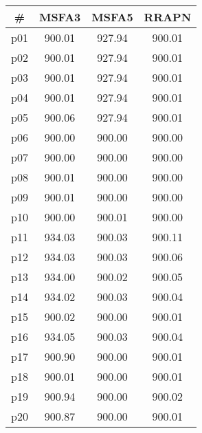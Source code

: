 \begin{tabular}{c||c|c|c}
\textbf{\#} & \textbf{MSFA3} & \textbf{MSFA5} & \textbf{RRAPN}\\
\hline
\hline
p01 & 900.01 & 927.94 & 900.01\\
p02 & 900.01 & 927.94 & 900.01\\
p03 & 900.01 & 927.94 & 900.01\\
p04 & 900.01 & 927.94 & 900.01\\
p05 & 900.06 & 927.94 & 900.01\\
p06 & 900.00 & 900.00 & 900.00\\
p07 & 900.00 & 900.00 & 900.00\\
p08 & 900.01 & 900.00 & 900.00\\
p09 & 900.01 & 900.00 & 900.00\\
p10 & 900.00 & 900.01 & 900.00\\
p11 & 934.03 & 900.03 & 900.11\\
p12 & 934.03 & 900.03 & 900.06\\
p13 & 934.00 & 900.02 & 900.05\\
p14 & 934.02 & 900.03 & 900.04\\
p15 & 900.02 & 900.00 & 900.01\\
p16 & 934.05 & 900.03 & 900.04\\
p17 & 900.90 & 900.00 & 900.01\\
p18 & 900.01 & 900.00 & 900.01\\
p19 & 900.94 & 900.00 & 900.02\\
p20 & 900.87 & 900.00 & 900.01\\
\end{tabular}

